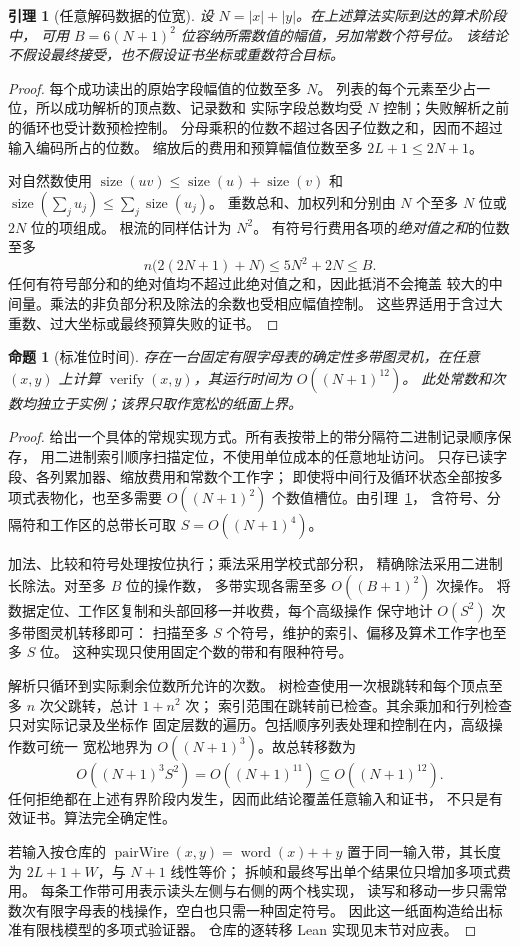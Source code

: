 \documentclass[UTF8,11pt]{ctexart}
\newtheorem{lemma}[theorem]{引理}
\newtheorem{proposition}[theorem]{命题}
\newcommand{\size}{\operatorname{size}}
\newcommand{\verify}{\operatorname{verify}}
\begin{document}
\begin{lemma}[任意解码数据的位宽]\label{lem:width}
设 $N=|x|+|y|$。在上述算法实际到达的算术阶段中，
可用 $B=6(N+1)^2$ 位容纳所需数值的幅值，另加常数个符号位。
该结论不假设最终接受，也不假设证书坐标或重数符合目标。
\end{lemma}
\begin{proof}
每个成功读出的原始字段幅值的位数至多 $N$。
列表的每个元素至少占一位，所以成功解析的顶点数、记录数和
实际字段总数均受 $N$ 控制；失败解析之前的循环也受计数预检控制。
分母乘积的位数不超过各因子位数之和，因而不超过输入编码所占的位数。
缩放后的费用和预算幅值位数至多 $2L+1\le2N+1$。

对自然数使用
$\size(uv)\le\size(u)+\size(v)$ 和
$\size(\sum_j u_j)\le\sum_j\size(u_j)$。
重数总和、加权列和分别由 $N$ 个至多 $N$ 位或 $2N$ 位的项组成。
根流的同样估计为 $N^2$。
有符号行费用各项的\emph{绝对值之和}的位数至多
\[
 n\bigl(2(2N+1)+N\bigr)\le 5N^2+2N\le B.
\]
任何有符号部分和的绝对值均不超过此绝对值之和，因此抵消不会掩盖
较大的中间量。乘法的非负部分积及除法的余数也受相应幅值控制。
这些界适用于含过大重数、过大坐标或最终预算失败的证书。
\end{proof}

\begin{proposition}[标准位时间]\label{prop:time}
存在一台固定有限字母表的确定性多带图灵机，在任意 $(x,y)$ 上计算
$\verify(x,y)$，其运行时间为 $O((N+1)^{12})$。
此处常数和次数均独立于实例；该界只取作宽松的纸面上界。
\end{proposition}
\begin{proof}
给出一个具体的常规实现方式。所有表按带上的带分隔符二进制记录顺序保存，
用二进制索引顺序扫描定位，不使用单位成本的任意地址访问。
只存已读字段、各列累加器、缩放费用和常数个工作字；
即使将中间行及循环状态全部按多项式表物化，也至多需要
$O((N+1)^2)$ 个数值槽位。由引理~\ref{lem:width}，
含符号、分隔符和工作区的总带长可取 $S=O((N+1)^4)$。

加法、比较和符号处理按位执行；乘法采用学校式部分积，
精确除法采用二进制长除法。对至多 $B$ 位的操作数，
多带实现各需至多 $O((B+1)^2)$ 次操作。
将数据定位、工作区复制和头部回移一并收费，每个高级操作
保守地计 $O(S^2)$ 次多带图灵机转移即可：
扫描至多 $S$ 个符号，维护的索引、偏移及算术工作字也至多 $S$ 位。
这种实现只使用固定个数的带和有限种符号。

解析只循环到实际剩余位数所允许的次数。
树检查使用一次根跳转和每个顶点至多 $n$ 次父跳转，总计 $1+n^2$ 次；
索引范围在跳转前已检查。其余乘加和行列检查只对实际记录及坐标作
固定层数的遍历。包括顺序列表处理和控制在内，高级操作数可统一
宽松地界为 $O((N+1)^3)$。故总转移数为
\[
 O((N+1)^3 S^2)=O((N+1)^{11})\subseteq O((N+1)^{12}).
\]
任何拒绝都在上述有界阶段内发生，因而此结论覆盖任意输入和证书，
不只是有效证书。算法完全确定性。

若输入按仓库的 $\operatorname{pairWire}(x,y)=\operatorname{word}(x)\mathbin{+\!+}y$
置于同一输入带，其长度为 $2L+1+W$，与 $N+1$ 线性等价；
拆帧和最终写出单个结果位只增加多项式费用。
每条工作带可用表示读头左侧与右侧的两个栈实现，
读写和移动一步只需常数次有限字母表的栈操作，空白也只需一种固定符号。
因此这一纸面构造给出标准有限栈模型的多项式验证器。
仓库的逐转移 Lean 实现见末节对应表。
\end{proof}
\end{document}
